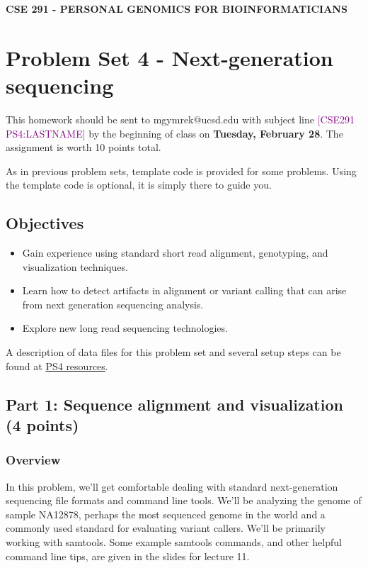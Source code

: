 \documentclass[12pt]{article}
\begin{document}
\textbf{CSE 291 - PERSONAL GENOMICS FOR BIOINFORMATICIANS}

\section*{Problem Set 4 - Next-generation sequencing}

This homework should be sent to mgymrek@ucsd.edu with subject line \textcolor{purple}{[CSE291 PS4:LASTNAME]} by the beginning of class on \textbf{Tuesday, February 28}. The assignment is worth 10 points total.

As in previous problem sets, template code is provided for some problems. Using the template code is optional, it is simply there to guide you.


\subsection*{Objectives}
\begin{itemize}
\item Gain experience using standard short read alignment, genotyping, and visualization techniques.
\item Learn how to detect artifacts in alignment or variant calling that can arise from next generation sequencing analysis.
\item Explore new long read sequencing technologies.
\end{itemize}

A description of data files for this problem set and several setup steps can be found at \href{https://gymreklab.github.io/teaching/personal\_genomics/ps4\_resources.html}{PS4 resources}. 

\subsection*{Part 1: Sequence alignment and visualization (4 points)}
\subsubsection*{Overview}

In this problem, we'll get comfortable dealing with standard next-generation sequencing file formats and command line tools. We'll be analyzing the genome of sample NA12878, perhaps the most sequenced genome in the world and a commonly used standard for evaluating variant callers. We'll be primarily working with samtools. Some example samtools commands, and other helpful command line tips, are given in the slides for lecture 11.
\end{document}
